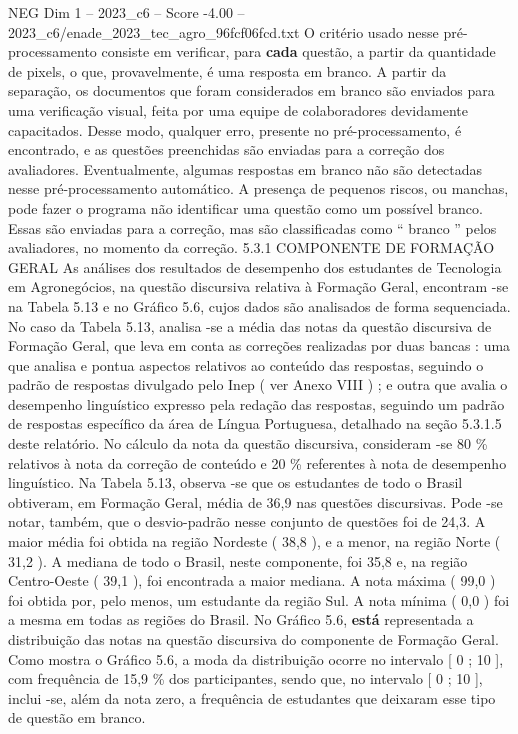 \begin{textsample}{NEG Dim 1 – 2023\_c6 – Score -4.00 – 2023\_c6/enade\_2023\_tec\_agro\_96fcf06fcd.txt}
O critério usado nesse pré-processamento consiste em verificar, para \textbf{cada} questão, a partir da quantidade de pixels, o que, provavelmente, é uma resposta em branco.
A partir da separação, os documentos que foram considerados em branco são enviados para uma verificação visual, feita por uma equipe de colaboradores devidamente capacitados.
Desse modo, qualquer erro, presente no pré-processamento, é encontrado, e as questões preenchidas são enviadas para a correção dos avaliadores.
Eventualmente, algumas respostas em branco não são detectadas nesse pré-processamento automático.
A presença de pequenos riscos, ou manchas, pode fazer o programa não identificar uma questão como um possível branco.
Essas são enviadas para a correção, mas são classificadas como “ branco ” pelos avaliadores, no momento da correção. 5.3.1 COMPONENTE DE FORMAÇÃO GERAL As análises dos resultados de desempenho dos estudantes de Tecnologia em Agronegócios, na questão discursiva relativa à Formação Geral, encontram -se na Tabela 5.13 e no Gráfico 5.6, cujos dados são analisados de forma sequenciada.
No caso da Tabela 5.13, analisa -se a média das notas da questão discursiva de Formação Geral, que leva em conta as correções realizadas por duas bancas : uma que analisa e pontua aspectos relativos ao conteúdo das respostas, seguindo o padrão de respostas divulgado pelo Inep ( ver Anexo VIII ) ; e outra que avalia o desempenho linguístico expresso pela redação das respostas, seguindo um padrão de respostas específico da área de Língua Portuguesa, detalhado na seção 5.3.1.5 deste relatório.
No cálculo da nota da questão discursiva, consideram -se 80 \% relativos à nota da correção de conteúdo e 20 \% referentes à nota de desempenho linguístico.
Na Tabela 5.13, observa -se que os estudantes de todo o Brasil obtiveram, em Formação Geral, média de 36,9 nas questões discursivas.
Pode -se notar, também, que o desvio-padrão nesse conjunto de questões foi de 24,3.
A maior média foi obtida na região Nordeste ( 38,8 ), e a menor, na região Norte ( 31,2 ).
A mediana de todo o Brasil, neste componente, foi 35,8 e, na região Centro-Oeste ( 39,1 ), foi encontrada a maior mediana.
A nota máxima ( 99,0 ) foi obtida por, pelo menos, um estudante da região Sul.
A nota mínima ( 0,0 ) foi a mesma em todas as regiões do Brasil.
No Gráfico 5.6, \textbf{está} representada a distribuição das notas na questão discursiva do componente de Formação Geral.
Como mostra o Gráfico 5.6, a moda da distribuição ocorre no intervalo [ 0 ; 10 ], com frequência de 15,9 \% dos participantes, sendo que, no intervalo [ 0 ; 10 ], inclui -se, além da nota zero, a frequência de estudantes que deixaram esse tipo de questão em branco.

\end{textsample}
